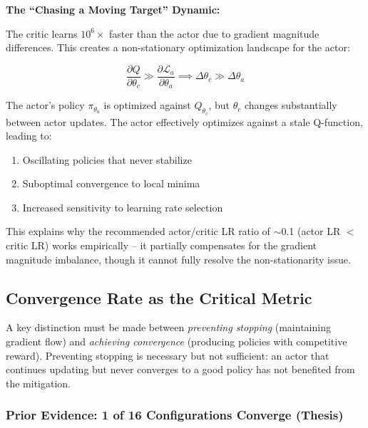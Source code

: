 \textbf{The ``Chasing a Moving Target'' Dynamic:}

The critic learns $10^6\times$ faster than the actor due to gradient magnitude differences. This creates a non-stationary optimization landscape for the actor:

\begin{equation}
\frac{\partial Q}{\partial \theta_c} \gg \frac{\partial \mathcal{L}_a}{\partial \theta_a} \implies \Delta \theta_c \gg \Delta \theta_a
\end{equation}

The actor's policy $\pi_{\theta_a}$ is optimized against $Q_{\theta_c}$, but $\theta_c$ changes substantially between actor updates. The actor effectively optimizes against a stale Q-function, leading to:
\begin{enumerate}
    \item Oscillating policies that never stabilize
    \item Suboptimal convergence to local minima
    \item Increased sensitivity to learning rate selection
\end{enumerate}

This explains why the recommended actor/critic LR ratio of $\sim$0.1 (actor LR $<$ critic LR) works empirically -- it partially compensates for the gradient magnitude imbalance, though it cannot fully resolve the non-stationarity issue.

\subsection{Convergence Rate as the Critical Metric}

A key distinction must be made between \textit{preventing stopping} (maintaining gradient flow) and \textit{achieving convergence} (producing policies with competitive reward). Preventing stopping is necessary but not sufficient: an actor that continues updating but never converges to a good policy has not benefited from the mitigation.

\subsubsection{Prior Evidence: 1 of 16 Configurations Converge (Thesis)}

